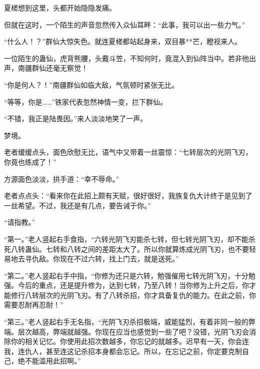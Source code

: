 \begin{this_body}
夏槎想到这里，头都开始隐隐发痛。

但就在这时，一个陌生的声音忽然传入众仙耳畔：“此事，我可以出一些力气。”

“什么人！？”群仙大惊失色。就连夏槎都站起身来，双目暴**芒，瞪视来人。

一位陌生的蛊仙，虎背熊腰，头戴斗笠，不知何时，竟混入到仙阵当中。若非他出声，南疆群仙还毫无察觉！

“你是何人？！”南疆群仙如临大敌，气氛顿时紧张无比。

“等等，你是……”铁家代表忽然神情一变，拦下群仙。

“不错，我正是陆畏因。”来人淡淡地笑了一声。

梦境。

老者缓缓点头，面色欣慰无比，语气中又带着一丝震惊：“七转层次的光阴飞刃，你竟也练成了！”

方源面色淡淡，拱手道：“幸不辱命。”

老者点点头：“看来你在此招上颇有天赋，很好很好，我族复仇大计终于是见到了一丝希望。不过，我还是有几点，要告诫于你。”

“请指教。”

“第一。”老人竖起右手食指，“六转光阴飞刃能杀七转，但七转光阴飞刃，却不能杀死八转蛊仙。七转和八转之间的差距太大了。所以你就算炼成光阴飞刃，也不要轻易地去寻仇敌。你现在不过六转，找上门去，就是送死。”

“第二。”老人竖起右手中指，“你修为还只是六转，勉强催用七转光阴飞刃，十分勉强。今后的重点，还是提升修为，达到七转，乃至八转！当你修为上升之后，你才能修行八转层次的光阴飞刃。有了八转杀招，你才具备复仇的能力。在此之前，你需要忍耐再忍耐！”

“第三。”老人竖起右手无名指，“光阴飞刃杀招极端，威能猛烈，有着非同一般的弊端。层次越高，弊端就越强。你现在应当也感觉到一些了吧？没错，光阴飞刃会消除你的相关记忆。你使用此招次数越多，你忘记的就越多。迟早有一天，你会连我，连仇人，甚至连这记杀招本身都会忘记。所以，在忘记之前，你定要克制自己，绝不能滥用此招啊。”

\end{this_body}

